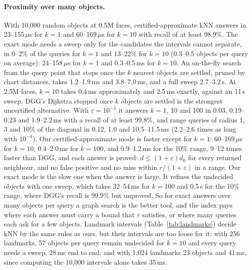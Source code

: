 \documentclass[sigconf,nonacm,screen]{acmart}
\newcommand{\eps}{\varepsilon}
\begin{document}
\paragraph{Proximity over many objects.}
With 10,000 random objects at 0.5M faces, certified-approximate kNN answers in 23--155\,$\mu$s for $k=1$ and
60--169\,$\mu$s for $k=10$ with recall of at least 98.9\%. The exact mode needs a sweep only for the candidates the
intervals cannot separate, in 0--2\% of the queries for $k=1$ and 13--22\% for $k=10$ (0.3--0.5 objects per query on
average): 24--158\,$\mu$s for $k=1$ and 0.3--0.5\,ms for $k=10$. An on-the-fly search from the query point that stops
once the $k$ nearest objects are settled, pruned by chart distances, takes 1.2--1.9\,ms and 3.8--7.0\,ms, and a full
sweep 2.7--3.2\,s. At 2.5M faces, $k=10$ takes 0.4\,ms approximately and 2.5\,ms exactly, against an 11\,s sweep.
DGG's Dijkstra stopped once $k$ objects are settled is the strongest uncertified alternative. With
$\eps=10^{-3}$ it answers $k=1$, 10 and 100 in 0.03, 0.19--0.23 and 1.9--2.2\,ms with a recall of at least 99.8\%,
and range queries of radius 1, 3 and 10\% of the diagonal in 0.12, 1.0 and 10.5--11.5\,ms (2.2--2.6 times as long
with $10^{-4}$). Our certified-approximate mode is faster except for $k=1$: 60--169\,$\mu$s for $k=10$, 0.4--2.0\,ms
for $k=100$, and 0.9--1.2\,ms for the 10\% range, 9--12 times faster than DGG, and each answer is proved: $d\le(1+\eps)d_k$
for every returned neighbour, and no false positive and no miss within $r/(1+\eps)$ in a range. Our exact mode is the slow one when the answer is large. It refines the
undecided objects with one sweep, which takes 32--54\,ms for $k=100$ and 0.5\,s for the 10\% range, where DGG's
recall is 99.9\% but unproved. So for exact answers over many objects per query a graph search is the better tool,
and the index pays where each answer must carry a bound that $\eps$ satisfies, or where many queries each ask
for a few objects. Landmark intervals (Table~\ref{tab:landmarks}) decide kNN by the same rules as ours, but their intervals are too loose
for it: with 256 landmarks, 57 objects per query remain undecided for $k=10$ and every query needs a sweep, 28\,ms
end to end, and with 1,024 landmarks 23 objects and 41\,ms, since computing the 10,000 intervals alone takes 35\,ms.
\end{document}
